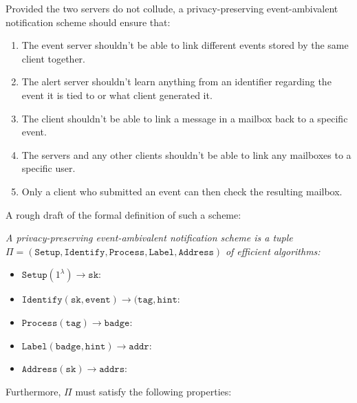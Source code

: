 Provided the two servers do not collude, a privacy-preserving event-ambivalent
notification scheme should ensure that:\par
\begin{enumerate}
  \item The event server shouldn't be able to link different events stored by the
    same client together.
  \item The alert server shouldn't learn anything from an identifier regarding the
    event it is tied to or what client generated it.
  \item The client shouldn't be able to link a message in a mailbox back to a
    specific event.
  \item The servers and any other clients shouldn't be able to link any mailboxes
    to a specific user.
  \item Only a client who submitted an event can then check the resulting mailbox.
\end{enumerate}

A rough draft of the formal definition of such a scheme:\par

\begin{define}
\label{define:model}
  
  \emph{A privacy-preserving event-ambivalent notification scheme is a tuple}\\
  $\Pi = \mathtt{(Setup, Identify, Process, Label, Address)}$ \emph{of efficient
  algorithms:}
  
  \begin{itemize}
    
    \item $\mathtt{Setup}(1^\lambda) \to \mathtt{sk}$:

    \item $\mathtt{Identify}(\mathtt{sk, event}) \to (\mathtt{tag, hint}$:

    \item $\mathtt{Process}(\mathtt{tag}) \to \mathtt{badge}$:
    
    \item $\mathtt{Label}(\mathtt{badge, hint}) \to \mathtt{addr}$:

    \item $\mathtt{Address}(\mathtt{sk}) \to \mathtt{addrs}$:
  
  \end{itemize}

\end{define}

Furthermore, $\Pi$ must satisfy the following properties:

